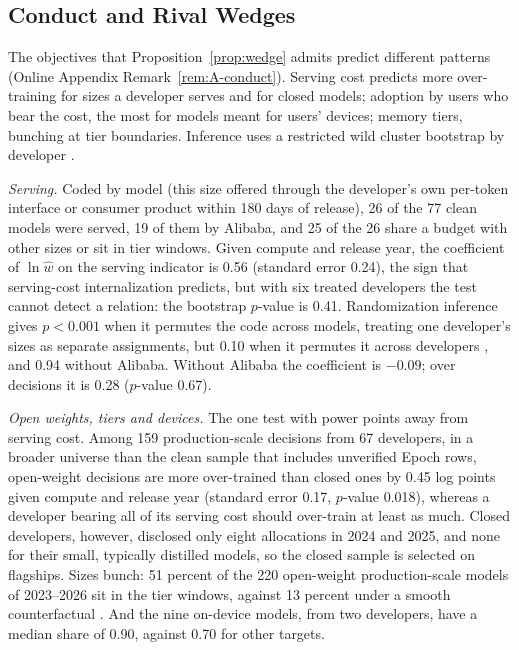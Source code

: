 \subsection{Conduct and Rival Wedges}\label{sec:wedge-conduct}

The objectives that Proposition~\ref{prop:wedge} admits predict different patterns (Online Appendix
Remark~\ref{rem:A-conduct}). Serving cost predicts more over-training for sizes a developer serves and for closed
models; adoption by users who bear the cost, the most for models meant for users' devices; memory tiers, bunching at
tier boundaries. Inference uses a restricted wild cluster bootstrap by developer
\citep{cameron2008bootstrap,webb2023reworking}.

\textit{Serving.} Coded by model (this size offered through the developer's own per-token interface or consumer
product within 180 days of release), 26 of the 77 clean models were served, 19 of them by Alibaba, and 25 of the 26
share a budget with other sizes or sit in tier windows. Given compute and release year, the coefficient of $\ln\hat w$ on
the serving indicator is 0.56 (standard error 0.24), the sign that serving-cost internalization predicts, but with six
treated developers the test cannot detect a relation: the bootstrap $p$-value is 0.41. Randomization inference gives
$p<0.001$ when it permutes the code across models, treating one developer's sizes as separate assignments, but 0.10 when
it permutes it across developers \citep{mackinnon2020randomization}, and 0.94 without Alibaba. Without Alibaba the
coefficient is $-0.09$; over decisions it is 0.28 ($p$-value 0.67).

\textit{Open weights, tiers and devices.} The one test with power points away from serving cost. Among 159
production-scale decisions from 67 developers, in a broader universe than the clean sample that includes unverified
Epoch rows, open-weight decisions are more over-trained than closed ones by 0.45 log points given compute and release
year (standard error 0.17, $p$-value 0.018), whereas a developer bearing all of its serving cost should over-train at
least as much. Closed developers, however, disclosed only eight allocations in 2024 and 2025, and none for their small,
typically distilled models, so the closed sample is selected on flagships. Sizes bunch: 51 percent of the 220
open-weight production-scale models of 2023--2026 sit in the tier windows, against 13 percent under a smooth
counterfactual \citep{chetty2011adjustment,kleven2016bunching}. And the nine on-device models, from two developers, have
a median share of 0.90, against 0.70 for other targets.

